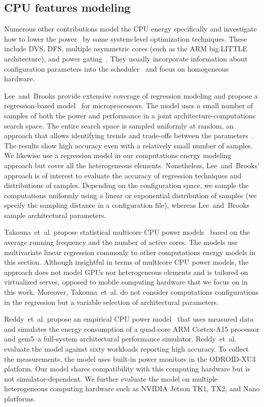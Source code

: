\subsection{CPU features modeling}
\label{sec:soa-cpu}

Numerous other contributions model the CPU energy specifically and investigate how to lower the power~\citep{hong1999power, luo2001battery, chowdhury2005static} by some system-level optimization techniques. These include DVS, DFS, multiple asymmetric cores (such as the ARM big.LITTLE architecture), and power gating~\citep{walker2017accurate}. They usually incorporate information about configuration parameters into the scheduler~\citep{seewald2019coarse} and focus on homogeneous hardware. 

Lee~and~Brooks provide extensive coverage of regression modeling and propose a regression-based model~\citep{lee2006statistically,lee2006accurate} for microprocessors. The model uses a small number of samples of both the power and performance in a joint architecture-computations search space. The entire search space is sampled uniformly at random, an approach that allows identifying trends and trade-offs between the parameters~\citep{lee2006accurate}. The results show high accuracy even with a relatively small number of samples. We likewise use a regression model in our computations energy modeling approach but cover all the heterogeneous elements. Nonetheless, Lee~and~Brooks' approach is of interest to evaluate the accuracy of regression techniques and distributions of samples. Depending on the configuration space, we sample the computations uniformly using a linear or exponential distribution of samples (we specify the sampling distance in a configuration file), whereas Lee~and~Brooks sample architectural parameters.

Takouna~et~al. propose statistical multicore CPU power models~\citep{takouna2011accurate} based on the average running frequency and the number of active cores. The models use multivariate linear regression commonly to other computations energy models in this section. Although insightful in terms of multicore CPU power models, the approach does not model GPUs nor heterogeneous elements and is tailored on virtualized serves, opposed to mobile computing hardware that we focus on in this work. Moreover, Takouna~et~al. do not consider computations configurations in the regression but a variable selection of architectural parameters.

Reddy~et~al. propose an empirical CPU power model~\citep{reddy2017empirical} that uses measured data and simulates the energy consumption of a quad-core ARM Cortex-A15 processor and gem5--a full-system architectural performance simulator. Reddy~et~al. evaluate the model against sixty workloads reporting high accuracy. To collect the measurements, the model uses built-in power monitors in the ODROID-XU3 platform. Our model shares compatibility with this computing hardware but is not simulator-dependent. We further evaluate the model on multiple heterogeneous computing hardware such as NVIDIA Jetson TK1, TX2, and Nano platforms.

